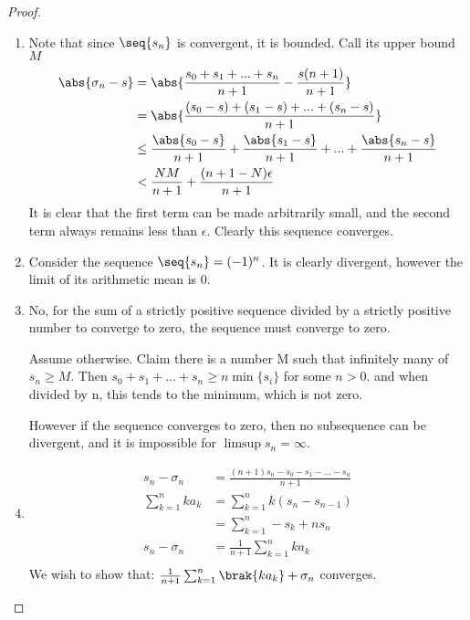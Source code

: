 \documentclass[12pt, letterpaper]{paper}
\begin{document}
\begin{proof}
  \begin{enumerate}
  \item Note that since $\seq{s_n}$ is convergent, it is bounded. Call
    its upper bound $M$
    \begin{align*}
      \abs{\sigma_n -s } &= \abs{ \frac{s_0 + s_1 + ... + s_n }{n+1} -
                           \frac{s(n+1)}{n+1}}\\
                         &= \abs{ \frac{ (s_0 - s) + (s_1 - s) +
                           ... + (s_n - s)}{n+1}}\\
                         &\leq \frac{\abs{s_0 -s }}{n+1} +
                           \frac{\abs{s_1-s}}{n+1} + ... +
                           \frac{\abs{s_n-s}}{n+1}\\
                         &< \frac{NM}{n+1} + \frac{(n+1-N)\epsilon}{n+1}\\
    \end{align*}
    It is clear that the first term can be made arbitrarily small, and
    the second term always remains less than $\epsilon$. Clearly this
    sequence converges.
  \item Consider the sequence $\seq{s_n} = (-1)^n$. It is clearly
    divergent, however the limit of its arithmetic mean is 0.
  \item No, for the sum of a strictly positive sequence divided by a
    strictly positive number to converge to zero, the sequence must
    converge to zero.

    Assume otherwise. Claim there is a number M such that infinitely
    many of $s_n \geq M$. Then
    $s_0 + s_1 + ... + s_n \geq n \min\{ s_i \}$ for some $n > 0$. and
    when divided by n, this tends to the minimum, which is not zero.

    However if the sequence converges to zero, then no subsequence can
    be divergent, and it is impossible for $\limsup s_n = \infty$.
  \item
    \begin{align*}
      s_n - \sigma_n &= \frac{(n+1)s_n - s_0 - s_1 - ... - s_n}{n+1}\\
      \sum_{k=1}^n ka_k &= \sum_{k=1}^n k ( s_n - s_{n-1} )\\
                     &= \sum_{k=1}^n - s_k + n s_n \\
      s_n - \sigma_n &= \frac{1}{n+1} \sum_{k=1}^n k a_k\\
    \end{align*}
    We wish to show that:
    $\frac{1}{n+1} \sum_{k=1}^n \brak{ k a_k } + \sigma_n$ converges.
  \end{enumerate}
\end{proof}
\end{document}
